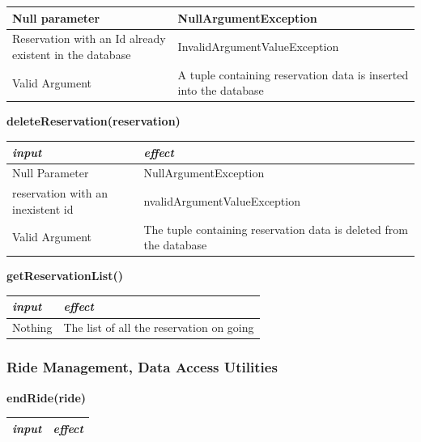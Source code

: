 \documentclass{article}
\begin{document}
\begin{flushleft}
\begin{center}
\begin{tabular}{  |  p{6cm} | p{6cm} |}
   Null parameter & NullArgumentException 
     \\ 
  \hline
  Reservation with an Id already existent in the database & InvalidArgumentValueException \\
  \hline
  Valid Argument & A tuple containing reservation data is inserted into the database \\
  \hline
    \end{tabular}
\end{center}

\begin{center}
   \begin {flushleft}
    \textbf{deleteReservation(reservation)}
    \end{flushleft}
        \begin{tabular}{  |  p{6cm} | p{6cm} |}
    \hline
    \textit{input} &  \textit{effect} \\
    \hline
    
   Null Parameter &  NullArgumentException
     \\ 
  \hline
   reservation with an inexistent id &  nvalidArgumentValueException\\
  \hline
 Valid Argument &  The tuple containing reservation data is deleted from the database  \\
  \hline
    \end{tabular}
\end{center}

\begin{center}
   \begin {flushleft}
    \textbf{getReservationList()}
    \end{flushleft}
        \begin{tabular}{  |  p{6cm} | p{6cm} |}
    \hline
    \textit{input} &  \textit{effect} \\
    \hline
    
    Nothing &  The list of all the reservation on going \\

  
  \hline
    \end{tabular}
\end{center}


  
   \subsubsection{Ride Management, Data Access Utilities} %
   
  \begin{center}
   \begin {flushleft}
    \textbf{endRide(ride)}
    \end{flushleft}
        \begin{tabular}{  |  p{6cm} | p{6cm} |}
    \hline
    \textit{input} &  \textit{effect} \\
    \hline
    

\end{tabular}
\end{center}
\end{flushleft}
\end{document}
